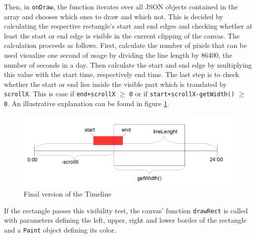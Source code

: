 Then,  in \lstinline$onDraw$, the function iterates over all JSON objects contained in the array and chooses which ones to draw and which not. This is decided by calculating the respective rectangle's start and end edges and checking whether at least the start or end edge is visible in the current clipping of the canvas. The calculation proceeds as follows. First, calculate the number of pixels that can be used visualize one second of usage by dividing the line length by 86400, the number of seconds in a day. Then calculate the start and end edge by multiplying this value with the start time, respectively end time. The last step is to check whether the start or end lies inside the visible part which is translated by \lstinline{scrollX}. This is case if \lstinline$end+scrollX$ $\ge$ \lstinline$0$ or if \lstinline$start+scrollX-getWidth()$ $\ge$ \lstinline$0$. An illustrative explanation can be found in figure \ref{fig:visibilitytest}.
\begin{figure}[h]
	\caption{Final version of the Timeline}
	\label{fig:visibilitytest}
	\includegraphics[width=\textwidth]{images/visibilitytest.png}
\end{figure}
If the rectangle passes this visibility test, the canvas' function \lstinline$drawRect$ is called with parameters defining the left, upper, right and lower border of the rectangle and a \lstinline$Paint$ object defining its color.

